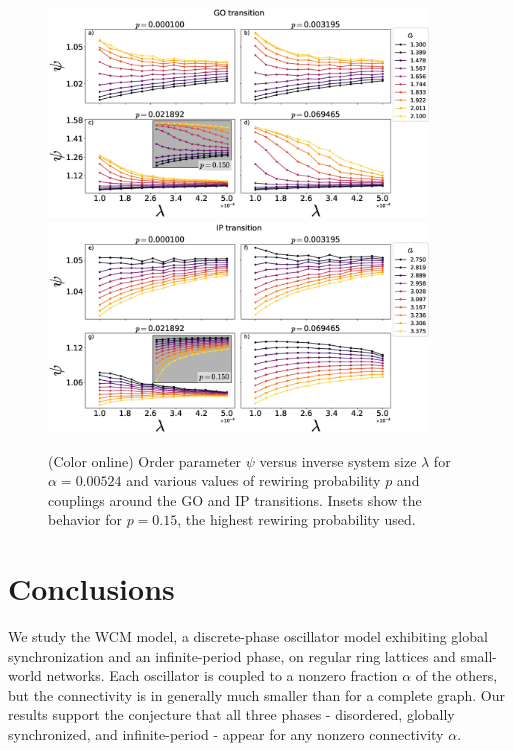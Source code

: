 \begin{figure}
\begin{center}
    \includegraphics[width=0.9\textwidth]{fig/chap2/opsplit-psi-GOT-pvalue.eps}
    \includegraphics[width=0.9\textwidth]{fig/chap2/opsplit-psi-IPT-pvalue.eps}
\caption{\label{fig:pvalue} (Color online) Order parameter $\psi$ versus inverse system size $\lambda$ for $\alpha=0.00524$ and various
values of rewiring probability $p$ and couplings around the GO and IP transitions. Insets show the behavior for $p=0.15$, the highest
rewiring probability used.}
\end{center}
\end{figure}

\clearpage


\section{\label{conclusions}Conclusions}


We study the WCM model, a discrete-phase oscillator model exhibiting global synchronization and an infinite-period phase, on regular
ring lattices and small-world networks.  Each oscillator is coupled to a nonzero fraction $\alpha$ of the others, but the connectivity
is in generally much smaller than for a complete graph.  Our results support the conjecture that all three phases - disordered,
globally synchronized, and infinite-period - appear for any nonzero connectivity $\alpha$. 

